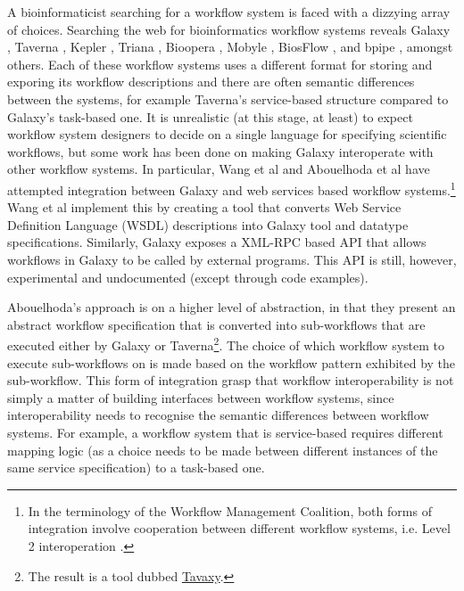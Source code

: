 \documentclass[a4paper,10pt]{scrreprt}
\begin{document}
A bioinformaticist searching for a workflow system is faced with a dizzying array of choices. Searching 
the web for bioinformatics workflow systems reveals Galaxy \cite{giardine_galaxy:_2005}, Taverna \cite{oinn_taverna:_2004}, Kepler \cite{altintas_kepler:_2004}, Triana \cite{churches_programming_2006}, Bioopera \cite{bausch_bioopera:_2002}, Mobyle \cite{neron_mobyle:_2009}, BiosFlow \cite{xu_biosflow_2009}, \cite{orvis_ergatis:_2010} and bpipe \cite{sadedin_bpipe:_2012}, amongst others. Each of these workflow systems uses a different format for storing and exporing its workflow descriptions and there are often semantic differences between the systems, for example Taverna's service-based structure compared to Galaxy's task-based one. It is unrealistic (at this stage, at least) to expect workflow system designers to decide on a single language for specifying scientific workflows, but some work has been done on making Galaxy interoperate with other workflow systems. 
In particular, Wang et al \cite{wang_adapting_2009} and Abouelhoda et al \cite{abouelhoda_meta-workflows:_2010} have attempted integration between Galaxy and web services based workflow systems.\footnote{In the terminology of the Workflow Management Coalition, both forms of integration involve cooperation between different workflow systems, i.e. Level 2 interoperation \cite{workflow_management_coalition_workflow_1999}.} Wang et al implement this by creating a tool that converts Web Service Definition Language (WSDL) descriptions into Galaxy tool and datatype specifications. Similarly, Galaxy exposes a XML-RPC based API that allows workflows in Galaxy to be called by external programs. This API is still, however, experimental and undocumented (except through code examples).

Abouelhoda's approach is on a higher level of abstraction, in that they present an abstract workflow specification that is converted into sub-workflows that are executed either by Galaxy or Taverna\footnote{The result is a tool dubbed \href{http://www.tavaxy.org/}{Tavaxy}.}. The choice of which workflow system to execute sub-workflows on is made based on the workflow pattern exhibited by the sub-workflow. This form of integration grasp that workflow interoperability is not simply a matter of building interfaces between workflow systems, since interoperability needs to recognise the semantic differences between workflow systems. For example, a workflow system that is service-based requires different mapping logic (as a choice needs to be made between different instances of the same service specification) to a task-based one.
\end{document}
